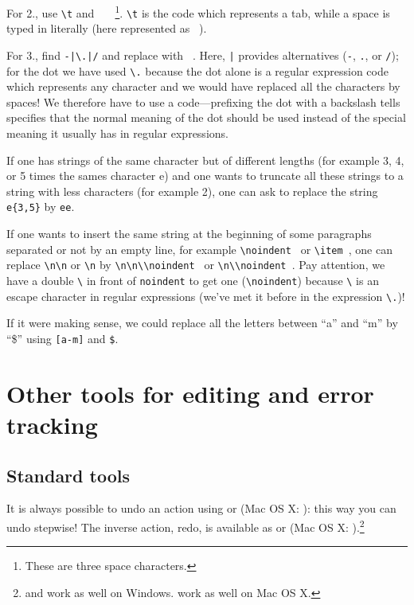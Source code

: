 For 2., use {\frq\verb+\t+\flq} and {\frq\verb*+   +\flq}\footnote{These are three space characters.}. {\frq\verb+\t+\flq} is the code which represents a tab, while a space is typed in literally (here represented as \verb*| |).

For 3., find {\frq\verb+-|\.|/+\flq} and replace with {\frq\verb*+ +\flq}. Here, {\frq\verb+|+\flq} provides alternatives (\verb|-|, \verb|.|, or \verb|/|); for the dot we have used {\frq\verb+\.+\flq} because the dot alone is a regular expression code which represents any character and we would have replaced all the characters by spaces! We therefore have to use a code---prefixing the dot with a backslash tells specifies that the normal meaning of the dot should be used instead of the special meaning it usually has in regular expressions.

If one has strings of the same character but of different lengths (for example 3, 4, or 5 times the sames character e) and one wants to truncate all these strings to a string with less characters (for example 2), one can ask to replace the string {\frq\verb+e{3,5}+\flq} by {\frq\verb+ee+\flq}.

If one wants to insert the same string at the beginning of some paragraphs separated or not by an empty line, for example {\frq\verb*+\noindent +\flq} or {\frq\verb*+\item +\flq}, one can replace {\frq\verb+\n\n+\flq} or {\frq\verb+\n+\flq} by {\frq\verb*+\n\n\\noindent +\flq} or {\frq\verb*+\n\\noindent +\flq}. Pay attention, we have a double \verb|\| in front of \verb|noindent| to get one (\verb|\noindent|) because \verb|\| is an escape character in regular expressions (we've met it before in the expression \verb|\.|)!

If it were making sense, we could replace all the letters between ``a'' and ``m'' by ``\$'' using {\frq\verb+[a-m]+\flq} and {\frq\verb+$+\flq}.

\section{Other tools for editing and error tracking}

\subsection{Standard tools}

It is always possible to undo an action using \submenu{} or  (Mac OS X: ): this way you can undo stepwise! The inverse action, redo, is available as \submenu{} or  (Mac OS X: ).\footnote{ and  work as well on Windows.  work as well on Mac OS X.}

